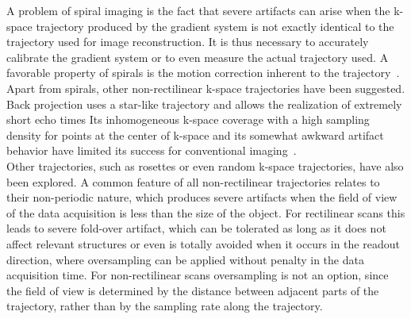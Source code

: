 \documentclass[english,version-2022-01]{uzl-thesis} %
\begin{document}
A problem of spiral imaging is the fact that severe artifacts can arise when the k-space trajectory produced by the gradient system is not exactly identical to the trajectory used for image reconstruction. It is thus necessary to accurately calibrate the gradient system or to even measure the actual trajectory used. 
A favorable property of spirals is the motion correction inherent to the trajectory~\cite{SpiralMRI3}. 
Apart from spirals, other non-rectilinear k-space trajectories have been suggested. 
Back projection uses a star-like trajectory and allows the realization of extremely short echo times 
Its inhomogeneous k-space coverage with a high sampling density for points at the center of k-space and its somewhat awkward artifact behavior have limited its success for conventional imaging~\cite{SamplingStrategies}. \\
Other trajectories, such as rosettes or even random k-space trajectories, have also been explored. A common feature of all non-rectilinear trajectories relates to their non-periodic nature, which produces severe artifacts when the field of view of the data acquisition is less than the size of the object. For rectilinear scans this leads to severe fold-over artifact, which can be tolerated as long as it does not affect relevant structures or even is totally avoided when it occurs in the readout direction, where oversampling can be applied without penalty in the data acquisition time. For non-rectilinear scans oversampling is not an option, since the field of view is determined by the distance between adjacent parts of the trajectory, rather than by the sampling rate along the trajectory. 
\end{document}
